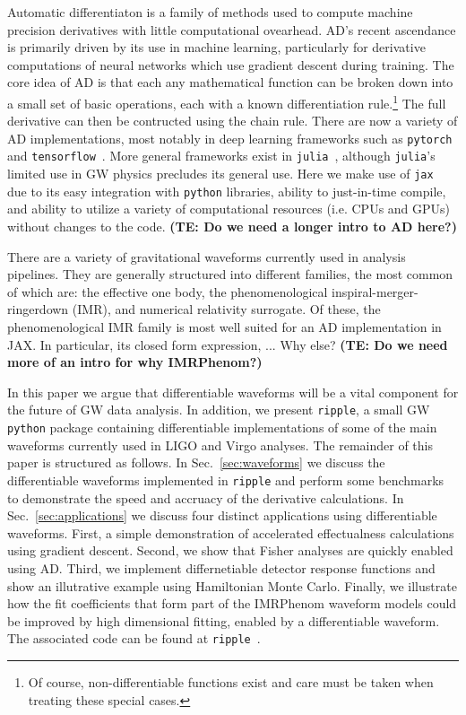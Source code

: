 \documentclass[twocolumn]{aastex631}
\newcommand{\TE}[1]{{\color{pyGreen} #1}}
\newcommand{\te}[1]{\textbf{\color{pyGreen}(TE: #1)}}
\begin{document}
Automatic differentiaton is a family of methods used to compute machine precision derivatives with little computational ovearhead. 
AD's recent ascendance is primarily driven by its use in machine learning, particularly for derivative computations of neural networks which use gradient descent during training.
The core idea of AD is that each any mathematical function can be broken down into a small set of basic operations, each with a known differentiation rule.\footnote{
    Of course, non-differentiable functions exist and care must be taken when treating these special cases.
    }
The full derivative can then be contructed using the chain rule.
There are now a variety of AD implementations, most notably in deep learning frameworks such as \texttt{pytorch}~\citep{pytorch} and \texttt{tensorflow}~\citep{tensorflow2015-whitepaper}.
More general frameworks exist in \texttt{julia}~\citep{zygote, forwarddiff}, although \texttt{julia}'s limited use in GW physics precludes its general use.
Here we make use of \texttt{jax}~\citep{jax2018github} due to its easy integration with \texttt{python} libraries, ability to just-in-time compile, and ability to utilize a variety of computational resources (i.e. CPUs and GPUs) without changes to the code.
\te{Do we need a longer intro to AD here?}

There are a variety of gravitational waveforms currently used in analysis pipelines.
They are generally structured into different families, the most common of which are: the effective one body, the phenomenological inspiral-merger-ringerdown (IMR), and numerical relativity surrogate.
Of these, the phenomenological IMR family is most well suited for an AD implementation in JAX.
In particular, its closed form expression, ... \TE{Why else?}
\te{Do we need more of an intro for why IMRPhenom?}


In this paper we argue that differentiable waveforms will be a vital component for the future of GW data analysis.
In addition, we present \texttt{ripple}, a small GW \texttt{python} package containing differentiable implementations of some of the main waveforms currently used in LIGO and Virgo analyses. 
The remainder of this paper is structured as follows. 
In Sec.~\ref{sec:waveforms} we discuss the differentiable waveforms implemented in \texttt{ripple} and perform some benchmarks to demonstrate the speed and accruacy of the derivative calculations. 
In Sec.~\ref{sec:applications} we discuss four distinct applications using differentiable waveforms. 
First, a simple demonstration of accelerated effectualness calculations using gradient descent.
Second, we show that Fisher analyses are quickly enabled using AD.
Third, we implement differnetiable detector response functions and show an illutrative example using Hamiltonian Monte Carlo.
Finally, we illustrate how the fit coefficients that form part of the IMRPhenom waveform models could be improved by high dimensional fitting, enabled by a differentiable waveform. 
The associated code can be found at \texttt{ripple}~\citep{ripple}.
\end{document}
